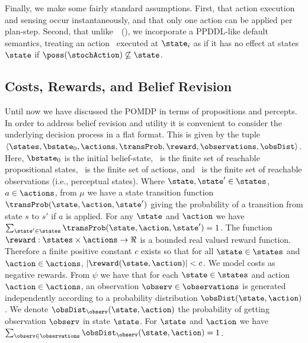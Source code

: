 Finally, we make some fairly standard assumptions. First, that
action execution and sensing occur instantaneously, and that only one
action can be applied per plan-step. Second, 
that
unlike~\citeauthor{hoffmann:brafman:2006}~(\citeyear{hoffmann:brafman:2006}),
we incorporate a PPDDL-like default semantics, treating an action
\stochAction\ executed at $\state_i$ as if it has no effect at
states $\state$ if $\poss(\stochAction) \not\subseteq
\state$.


\subsection{Costs, Rewards, and Belief Revision}

Until now we have discussed the POMDP in terms of propositions and
percepts. In order to address belief revision and utility it is
convenient to consider the underlying decision process in a flat
format. This is given by the tuple
$\langle \states, \bstate_0, \actions, \transProb, \reward,
\observations, \obsDist \rangle$. Here, $\bstate_0$ is the initial
belief-state, \states\ is the finite set of reachable propositional
states, \actions\ is the finite set of actions, and \observations\ is
the finite set of reachable observations (i.e., perceptual states).
Where $\state, \state' \in \states$, $a \in \actions$, from $\mu$ we
have a state transition function $\transProb(\state, \action,
\state')$ giving the probability of a transition from state $s$ to
$s'$ if $a$ is applied. For any $\state$ and $\action$ we have
$\sum_{\state' \in \states} \transProb(\state, \action, \state') = 1$.
The function $\reward:\states \times \actions \to \Re$ is a bounded real
valued reward function. Therefore a finite positive constant $c$
exists so that for all $\state \in \states$ and $\action \in
\actions$, $|\reward(\state, \action)| < c$. We model costs as
negative rewards.
From $\psi$ we have that for each $\state \in \states$ and action
$\action \in \actions$, an observation $\observ \in \observations$ is
generated independently according to a probability distribution
$\obsDist(\state, \action)$. We denote $\obsDist_\observ(\state,
\action)$ the probability of getting observation $\observ$ in state
$\state$. For $\state$ and $\action$ we have $\sum_{\observ \in
\observations} \obsDist_\observ(\state, \action) = 1$.

